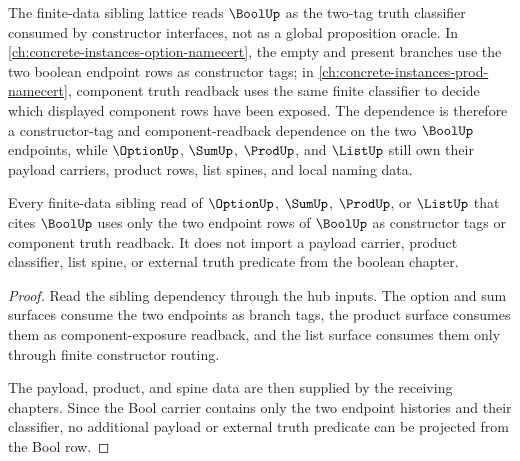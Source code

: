The finite-data sibling lattice reads $\BoolUp$ as the two-tag truth classifier consumed by constructor interfaces, not as a global proposition oracle. In \autoref{ch:concrete-instances-option-namecert}, the empty and present branches use the two boolean endpoint rows as constructor tags; in \autoref{ch:concrete-instances-prod-namecert}, component truth readback uses the same finite classifier to decide which displayed component rows have been exposed. The dependence is therefore a constructor-tag and component-readback dependence on the two $\BoolUp$ endpoints, while $\OptionUp$, $\SumUp$, $\ProdUp$, and $\ListUp$ still own their payload carriers, product rows, list spines, and local naming data.

\begin{proposition}
\label{prop:bool-finite-data-sibling-readback}
Every finite-data sibling read of $\OptionUp$, $\SumUp$, $\ProdUp$, or $\ListUp$ that cites $\BoolUp$ uses only the two endpoint rows of $\BoolUp$ as constructor tags or component truth readback. It does not import a payload carrier, product classifier, list spine, or external truth predicate from the boolean chapter.
\end{proposition}
\begin{proof}
Read the sibling dependency through the hub inputs. The option and sum surfaces consume the two endpoints as branch tags, the product surface consumes them as component-exposure readback, and the list surface consumes them only through finite constructor routing.

The payload, product, and spine data are then supplied by the receiving chapters. Since the Bool carrier contains only the two endpoint histories and their classifier, no additional payload or external truth predicate can be projected from the Bool row.
\end{proof}
